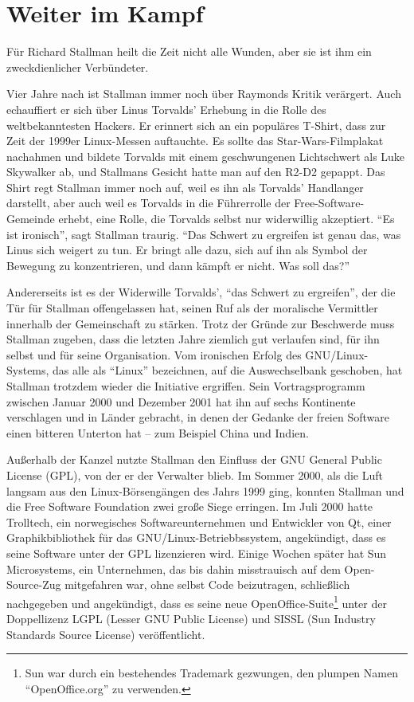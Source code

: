 \chapter{Weiter im Kampf}

Für Richard Stallman heilt die Zeit nicht alle Wunden, aber sie ist ihm ein zweckdienlicher Verbündeter.

Vier Jahre nach  ist Stallman immer noch über Raymonds Kritik verärgert. Auch echauffiert er sich über Linus Torvalds' Erhebung in die Rolle des weltbekanntesten Hackers. Er erinnert sich an ein populäres T-Shirt, dass zur Zeit der 1999er Linux-Messen auftauchte. Es sollte das Star-Wars-Filmplakat nachahmen und bildete Torvalds mit einem geschwungenen Lichtschwert als Luke Skywalker ab, und Stallmans Gesicht hatte man auf den R2-D2 gepappt. Das Shirt regt Stallman immer noch auf, weil es ihn als Torvalds' Handlanger darstellt, aber auch weil es Torvalds in die Führerrolle der Free-Software-Gemeinde erhebt, eine Rolle, die Torvalds selbst nur widerwillig akzeptiert. "`Es ist ironisch"', sagt Stallman traurig. "`Das Schwert zu ergreifen ist genau das, was Linus sich weigert zu tun. Er bringt alle dazu, sich auf ihn als Symbol der Bewegung zu konzentrieren, und dann kämpft er nicht. Was soll das?"'

Andererseits ist es der Widerwille Torvalds', "`das Schwert zu ergreifen"', der die Tür für Stallman offengelassen hat, seinen Ruf als der moralische Vermittler innerhalb der Gemeinschaft zu stärken. Trotz der Gründe zur Beschwerde muss Stallman zugeben, dass die letzten Jahre ziemlich gut verlaufen sind, für ihn selbst und für seine Organisation. Vom ironischen Erfolg des GNU/Linux-Systems, das alle als "`Linux"' bezeichnen, auf die Auswechselbank geschoben, hat Stallman trotzdem wieder die Initiative ergriffen. Sein Vortragsprogramm zwischen Januar 2000 und Dezember 2001 hat ihn auf sechs Kontinente verschlagen und in Länder gebracht, in denen der Gedanke der freien Software einen bitteren Unterton hat – zum Beispiel China und Indien.

Außerhalb der Kanzel nutzte Stallman den Einfluss der GNU General Public License (GPL), von der er der Verwalter blieb. Im Sommer 2000, als die Luft langsam aus den Linux-Börsengängen des Jahrs 1999 ging, konnten Stallman und die Free Software Foundation zwei große Siege erringen. Im Juli 2000 hatte Trolltech, ein norwegisches Softwareunternehmen und Entwickler von Qt, einer Graphikbibliothek für das GNU/Linux-Betriebbssystem, angekündigt, dass es seine Software unter der GPL lizenzieren wird. Einige Wochen später hat Sun Microsystems, ein Unternehmen, das bis dahin misstrauisch auf dem Open-Source-Zug mitgefahren war, ohne selbst Code beizutragen, schließlich nachgegeben und angekündigt, dass es seine neue OpenOffice-Suite\footnote{Sun war durch ein bestehendes Trademark gezwungen, den plumpen Namen "`OpenOffice.org"' zu verwenden.} unter der Doppellizenz LGPL (Lesser GNU Public License) und SISSL (Sun Industry Standards Source License) veröffentlicht.

